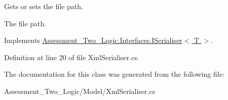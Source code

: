 Gets or sets the file path. 

The file path.

Implements \hyperlink{interface_assessment___two___logic_1_1_interfaces_1_1_i_serialiser-g_a2f6470b19a000b3397201e9f8afd1911}{Assessment\_\-Two\_\-Logic.Interfaces.ISerialiser$<$ T $>$}.



Definition at line 20 of file XmlSerialiser.cs.



The documentation for this class was generated from the following file:\begin{DoxyCompactItemize}
\item 
Assessment\_\-Two\_\-Logic/Model/XmlSerialiser.cs\end{DoxyCompactItemize}
